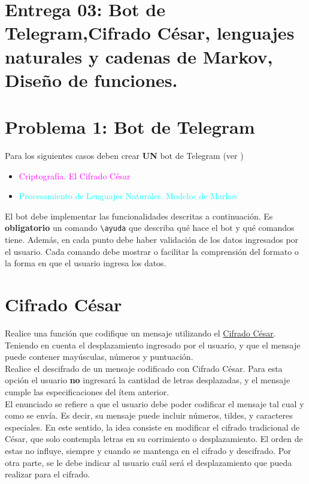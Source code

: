 \clearpage
\section{Entrega 03: Bot de Telegram,Cifrado César, lenguajes naturales y cadenas de Markov, Diseño de funciones.}

\section*{Problema 1: Bot de Telegram}
Para los siguientes casos deben crear \textbf{UN} bot de Telegram (ver \cite{noauthor_telegram_nodate})
\begin{itemize}
    \item \textcolor{magenta}{Criptografía. El Cifrado César}
\item  \textcolor{cyan}{Procesamiento de Lenguajes Naturales. Modelos de Markov}
\end{itemize}


El bot debe implementar las funcionalidades descritas a continuación. Es \textbf{obligatorio} un comando \texttt{\textbackslash ayuda} que describa qué hace el bot y qué comandos tiene. Además, en cada punto debe haber validación de los datos ingresados por el usuario. Cada comando debe mostrar o facilitar la comprensión del formato o la forma en que el usuario ingresa los datos.


\section*{Cifrado César}
    Realice una función que codifique un mensaje utilizando el \textcolor{cyan}{\href{https://es.wikipedia.org/wiki/Cifrado_C\%C3\%A9sar}{Cifrado César}}. Teniendo en cuenta el desplazamiento ingresado por el usuario, y que el mensaje puede contener mayúsculas, números y puntuación.\\
    Realice el descifrado de un mensaje codificado con Cifrado César. Para esta opción el usuario \textbf{no} ingresará la cantidad de letras desplazadas, y el mensaje cumple las especificaciones del ítem anterior.\\

El enunciado se refiere a que el usuario debe poder codificar el mensaje tal cual y como se envía. Es decir, su mensaje puede incluir números, tildes, y caracteres especiales. En este sentido, la idea consiste en modificar el cifrado tradicional de César, que solo contempla letras en su corrimiento o desplazamiento. El orden de estas no influye, siempre y cuando se mantenga en el cifrado y descifrado. Por otra parte, se le debe indicar al usuario cuál será el desplazamiento que pueda realizar para el cifrado.

